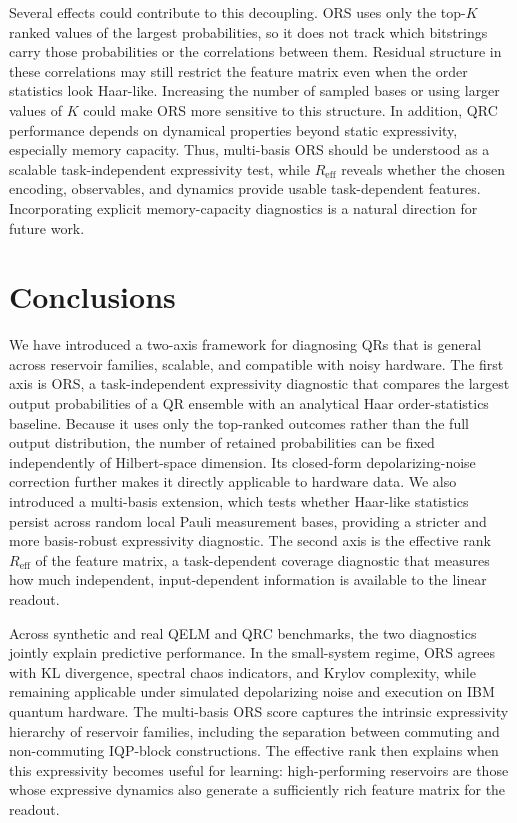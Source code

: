 \documentclass[
    aps,
    pre,
    amsmath,
    amssymb,
    reprint,
    superscriptaddress,
    preprintnumbers,
]{revtex4-2}
\begin{document}
Several effects could contribute to this decoupling. ORS uses only the top-$K$ ranked values of the largest probabilities, so it does not track which bitstrings carry those probabilities or the correlations between them. Residual structure in these correlations may still restrict the feature matrix even when the order statistics look Haar-like. Increasing the number of sampled bases or using larger values of $K$ could make ORS more sensitive to this structure. In addition, QRC performance depends on dynamical properties beyond static expressivity, especially memory capacity. Thus, multi-basis ORS should be understood as a scalable task-independent expressivity test, while $R_{\mathrm{eff}}$ reveals whether the chosen encoding, observables, and dynamics provide usable task-dependent features. Incorporating explicit memory-capacity diagnostics is a natural direction for future work.


\section{Conclusions}
\label{sec:conclusions}
We have introduced a two-axis framework for diagnosing QRs that is general across reservoir families, scalable, and compatible with noisy hardware. The first axis is ORS, a task-independent expressivity diagnostic that compares the largest output probabilities of a QR ensemble with an analytical Haar order-statistics baseline. Because it uses only the top-ranked outcomes rather than the full output distribution, the number of retained probabilities can be fixed independently of Hilbert-space dimension. Its closed-form depolarizing-noise correction further makes it directly applicable to hardware data. We also introduced a multi-basis extension, which tests whether Haar-like statistics persist across random local Pauli measurement bases, providing a stricter and more basis-robust expressivity diagnostic. The second axis is the effective rank $R_{\mathrm{eff}}$ of the feature matrix, a task-dependent coverage diagnostic that measures how much independent, input-dependent information is available to the linear readout.

Across synthetic and real QELM and QRC benchmarks, the two diagnostics jointly explain predictive performance. In the small-system regime, ORS agrees with KL divergence, spectral chaos indicators, and Krylov complexity, while remaining applicable under simulated depolarizing noise and execution on IBM quantum hardware. The multi-basis ORS score captures the intrinsic expressivity hierarchy of reservoir families, including the separation between commuting and non-commuting IQP-block constructions. The effective rank then explains when this expressivity becomes useful for learning: high-performing reservoirs are those whose expressive dynamics also generate a sufficiently rich feature matrix for the readout.
\end{document}
